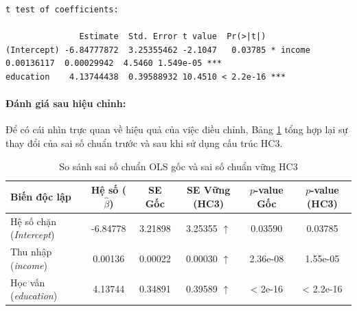 \begin{verbatim}
t test of coefficients:

               Estimate  Std. Error t value  Pr(>|t|)    
(Intercept) -6.84777872  3.25355462 -2.1047   0.03785 * income       0.00136117  0.00029942  4.5460 1.549e-05 ***
education    4.13744438  0.39588932 10.4510 < 2.2e-16 ***
\end{verbatim}

	\paragraph{Đánh giá sau hiệu chỉnh:} 
	Để có cái nhìn trực quan về hiệu quả của việc điều chỉnh, Bảng \ref{tab:robust_comparison} tổng hợp lại sự thay đổi của sai số chuẩn trước và sau khi sử dụng cấu trúc HC3.
	
	\begin{table}[H]
		\centering
		\caption{So sánh sai số chuẩn OLS gốc và sai số chuẩn vững HC3}
		\label{tab:robust_comparison}
		\small
		\renewcommand{\arraystretch}{1.2}
		\begin{tabular}{lccccc}
			\toprule
			\textbf{Biến độc lập} & \textbf{Hệ số ($\hat{\beta}$)} & \textbf{SE Gốc} & \textbf{SE Vững (HC3)} & \textbf{$p$-value Gốc} & \textbf{$p$-value (HC3)} \\
			\midrule
			Hệ số chặn (\textit{Intercept}) & -6.84778 & 3.21898 & 3.25355 $\uparrow$ & 0.03590 & 0.03785 \\
			Thu nhập (\textit{income})      &  0.00136 & 0.00022 & 0.00030 $\uparrow$ & 2.36e-08 & 1.55e-05 \\
			Học vấn (\textit{education})    &  4.13744 & 0.34891 & 0.39589 $\uparrow$ & < 2e-16  & < 2.2e-16 \\
			\bottomrule
		\end{tabular}
	\end{table}
